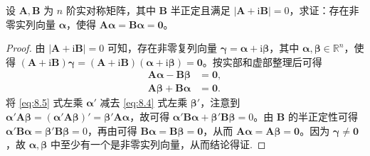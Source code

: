 \documentclass[../../main.tex]{subfiles}%
\begin{document}
\begin{proposition}\label{proposition:命题8.5735161}
设 $\boldsymbol{A},\boldsymbol{B}$ 为 $n$ 阶实对称矩阵，其中 $\boldsymbol{B}$ 半正定且满足 $|\boldsymbol{A}+\mathrm{i}\boldsymbol{B}| = 0$，求证：存在非零实列向量 $\boldsymbol{\alpha}$，使得 $\boldsymbol{A}\boldsymbol{\alpha}=\boldsymbol{B}\boldsymbol{\alpha}=\boldsymbol{0}$。
\end{proposition}
\begin{proof}
由 $|\boldsymbol{A}+\mathrm{i}\boldsymbol{B}| = 0$ 可知，存在非零复列向量 $\boldsymbol{\gamma}=\boldsymbol{\alpha}+\mathrm{i}\boldsymbol{\beta}$，其中 $\boldsymbol{\alpha},\boldsymbol{\beta}\in\mathbb{R}^n$，使得 $(\boldsymbol{A}+\mathrm{i}\boldsymbol{B})\boldsymbol{\gamma}=(\boldsymbol{A}+\mathrm{i}\boldsymbol{B})(\boldsymbol{\alpha}+\mathrm{i}\boldsymbol{\beta})=\boldsymbol{0}$。按实部和虚部整理后可得
\begin{align}
\boldsymbol{A}\boldsymbol{\alpha}-\boldsymbol{B}\boldsymbol{\beta}&=\boldsymbol{0}, \label{eq:8.4}\\
\boldsymbol{A}\boldsymbol{\beta}+\boldsymbol{B}\boldsymbol{\alpha}&=\boldsymbol{0}. \label{eq:8.5}
\end{align}
将 \eqref{eq:8.5} 式左乘 $\boldsymbol{\alpha}'$ 减去 \eqref{eq:8.4} 式左乘 $\boldsymbol{\beta}'$，注意到 $\boldsymbol{\alpha}'\boldsymbol{A}\boldsymbol{\beta}=(\boldsymbol{\alpha}'\boldsymbol{A}\boldsymbol{\beta})'=\boldsymbol{\beta}'\boldsymbol{A}\boldsymbol{\alpha}$，故可得 $\boldsymbol{\alpha}'\boldsymbol{B}\boldsymbol{\alpha}+\boldsymbol{\beta}'\boldsymbol{B}\boldsymbol{\beta}=0$。由 $\boldsymbol{B}$ 的半正定性可得 $\boldsymbol{\alpha}'\boldsymbol{B}\boldsymbol{\alpha}=\boldsymbol{\beta}'\boldsymbol{B}\boldsymbol{\beta}=0$，再由可得 $\boldsymbol{B}\boldsymbol{\alpha}=\boldsymbol{B}\boldsymbol{\beta}=\boldsymbol{0}$，从而 $\boldsymbol{A}\boldsymbol{\alpha}=\boldsymbol{A}\boldsymbol{\beta}=\boldsymbol{0}$。因为 $\boldsymbol{\gamma}\neq\boldsymbol{0}$，故 $\boldsymbol{\alpha},\boldsymbol{\beta}$ 中至少有一个是非零实列向量，从而结论得证.
\end{proof}
\end{document}
